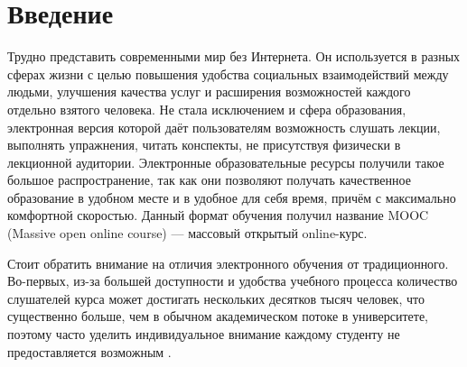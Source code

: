 \documentclass{matmex-diploma-custom}
\begin{document}
\maketitle
\tableofcontents
\section*{Введение}

Трудно представить современными мир без Интернета. Он используется в
разных сферах жизни с целью повышения удобства социальных
взаимодействий между людьми, улучшения качества услуг и расширения
возможностей каждого отдельно взятого человека.  Не стала исключением
и сфера образования, электронная версия которой даёт пользователям
возможность слушать лекции, выполнять упражнения, читать конспекты, не
присутствуя физически в лекционной аудитории. Электронные
образовательные ресурсы получили такое большое распространение, так
как они позволяют получать качественное образование в удобном месте и
в удобное для себя время, причём с максимально комфортной
скоростью. Данный формат обучения получил название MOOC (Massive open
online course) --- массовый открытый online-курс.

Стоит обратить внимание на отличия электронного обучения от
традиционного.  Во-первых, из-за большей доступности и удобства
учебного процесса количество слушателей курса может достигать
нескольких десятков тысяч человек, что существенно больше, чем в
обычном академическом потоке в университете, поэтому часто уделить
индивидуальное внимание каждому студенту не предоставляется возможным
\cite{breslow2013studying}.
\end{document}
